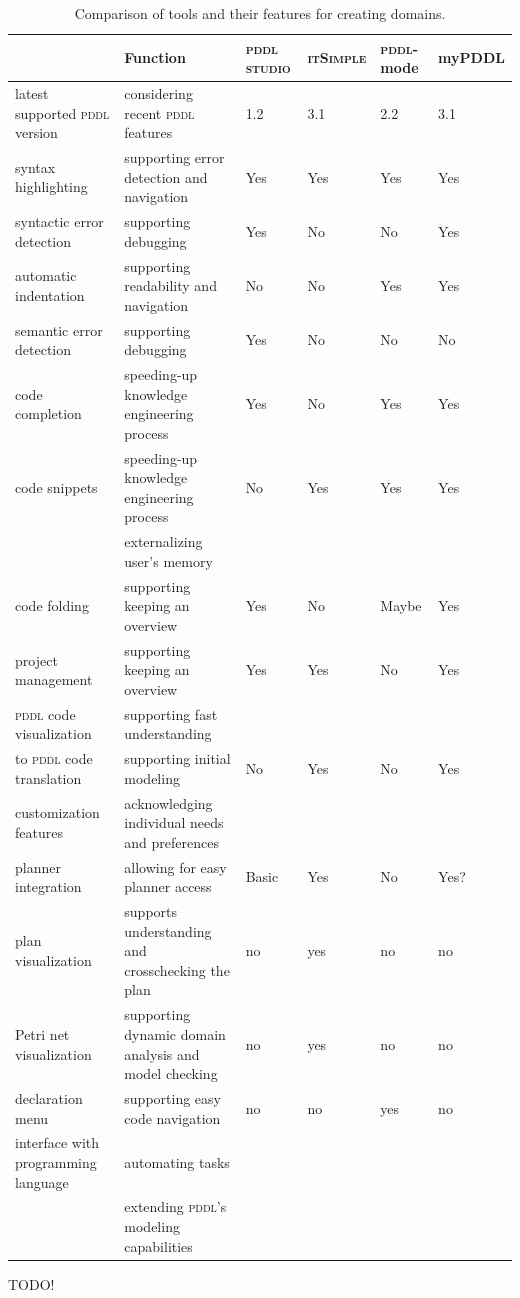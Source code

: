 \documentclass[a4paper,12pt]{report}
\newcommand{\mypddl}{\smallerft[0.8]{myPDDL}\xspace}
\newcommand{\pddlstudio}{\textsc{pddl studio}\xspace}
\newcommand{\itsimple}{\textsc{itSimple}\xspace}
\newcommand{\pddlmode}{\textsc{pddl}-mode\xspace}
\newcommand{\pddl}{\textsc{pddl}\xspace}
\newcommand\smallerft[2][0.85]{{\scalefont{#1}#2}}
\begin{document}
\begin{table}
\centering
\footnotesize
\begin{tabular}{ll|llll}
 & Function & \pddlstudio & \itsimple & \pddlmode & \mypddl\\
\hline
latest supported \pddl version & considering recent \pddl features & 1.2 & 3.1 & 2.2 & 3.1\\
syntax highlighting & supporting error detection and navigation & Yes & Yes & Yes & Yes\\
syntactic error detection & supporting debugging & Yes & No & No & Yes\\
automatic indentation & supporting readability and navigation & No & No & Yes & Yes\\
semantic error detection & supporting debugging & Yes & No & No & No\\
code completion & speeding-up knowledge engineering process & Yes & No & Yes & Yes\\
code snippets & speeding-up knowledge engineering process & No & Yes & Yes & Yes\\
 & externalizing user's memory &  &  &  & \\
code folding & supporting keeping an overview & Yes & No & Maybe & Yes\\
project management & supporting keeping an overview & Yes & Yes & No & Yes\\
\pddl code visualization & supporting fast understanding &  &  &  & \\
\textasciidieresis{} to \pddl code translation & supporting initial modeling & No & Yes & No & Yes\\
customization features & acknowledging individual needs and preferences &  &  &  & \\
planner integration & allowing for easy planner access & Basic & Yes & No & Yes?\\
plan visualization & supports understanding and crosschecking the plan & no & yes & no & no\\
Petri net visualization & supporting dynamic domain analysis and model checking & no & yes & no & no\\
declaration menu & supporting easy code navigation & no & no & yes & no\\
interface with programming language & automating tasks &  &  &  & \\
 & extending \pddl's modeling capabilities &  &  &  & \\
\end{tabular}\caption{\label{tool-comp}Comparison of tools and their features for creating domains.}

\end{table}
TODO!
\end{document}
